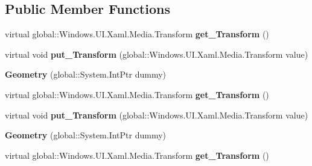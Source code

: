 \subsection*{Public Member Functions}
\begin{DoxyCompactItemize}
\item 
\mbox{\label{class_windows_1_1_u_i_1_1_xaml_1_1_media_1_1_geometry_a26afd36bad6c79f34f6f4011e49799f3}} 
virtual global\+::\+Windows.\+U\+I.\+Xaml.\+Media.\+Transform {\bfseries get\+\_\+\+Transform} ()
\item 
\mbox{\label{class_windows_1_1_u_i_1_1_xaml_1_1_media_1_1_geometry_a9af8f19a41909c886897170efd35d45d}} 
virtual void {\bfseries put\+\_\+\+Transform} (global\+::\+Windows.\+U\+I.\+Xaml.\+Media.\+Transform value)
\item 
\mbox{\label{class_windows_1_1_u_i_1_1_xaml_1_1_media_1_1_geometry_a9463ad2bd82641d8a3f900c9bacdaefd}} 
{\bfseries Geometry} (global\+::\+System.\+Int\+Ptr dummy)
\item 
\mbox{\label{class_windows_1_1_u_i_1_1_xaml_1_1_media_1_1_geometry_a26afd36bad6c79f34f6f4011e49799f3}} 
virtual global\+::\+Windows.\+U\+I.\+Xaml.\+Media.\+Transform {\bfseries get\+\_\+\+Transform} ()
\item 
\mbox{\label{class_windows_1_1_u_i_1_1_xaml_1_1_media_1_1_geometry_a9af8f19a41909c886897170efd35d45d}} 
virtual void {\bfseries put\+\_\+\+Transform} (global\+::\+Windows.\+U\+I.\+Xaml.\+Media.\+Transform value)
\item 
\mbox{\label{class_windows_1_1_u_i_1_1_xaml_1_1_media_1_1_geometry_a9463ad2bd82641d8a3f900c9bacdaefd}} 
{\bfseries Geometry} (global\+::\+System.\+Int\+Ptr dummy)
\item 
\mbox{\label{class_windows_1_1_u_i_1_1_xaml_1_1_media_1_1_geometry_a26afd36bad6c79f34f6f4011e49799f3}} 
virtual global\+::\+Windows.\+U\+I.\+Xaml.\+Media.\+Transform {\bfseries get\+\_\+\+Transform} ()

\end{DoxyCompactItemize}
